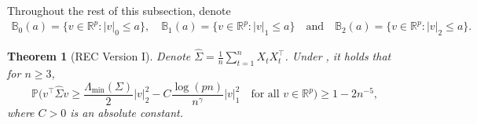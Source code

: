 \documentclass[11pt]{article}
\newcommand{\p}{\mathbb P}
\theoremstyle{plain}
\newtheorem{theorem}{Theorem}
\theoremstyle{definition}
\begin{document}
Throughout the rest of this subsection, denote
\begin{align*} 
\mathbb B_0( a )  = \{ v \in \mathbb R^p:  |v |_0\le a  \} ,
\quad 
\mathbb B_1 ( a )  = \{ v \in \mathbb R^p:  |v |_1\le a  \}  
\quad \text{and} \quad 
\mathbb B_2(a)   = \{ v \in \mathbb R^p :  |v |_2\le a   \}.
\end{align*} 
\begin{theorem}[REC Version I]\label{theorem:RES}
Denote $\widehat \Sigma = \frac{1}{n} \sum_{t=1}^n X_t X_t^\top $. Under   ,
  it holds that for $n\ge 3$,
$$  \p \bigg(    v^\top   \widehat \Sigma    v  \ge \frac{\Lambda_{\min } (\Sigma )}{2   }     |v  |_2^2  - C    \frac{\log(pn)}{n^\gamma  }       |v  |_1^2   \quad \text{for all } v \in \mathbb R^p \bigg) \ge 1- 2n^{-5},$$  
 where $C > 0$ is an absolute constant.
 
 
 \end{theorem}
 
 
 
\end{document}
